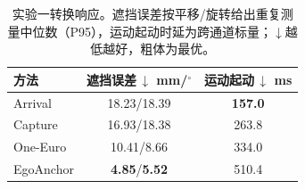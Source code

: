 \begin{table}[t]
\centering
\caption{实验一转换响应。遮挡误差按平移/旋转给出重复测量中位数（P95），运动起动时延为跨通道标量；$\downarrow$越低越好，粗体为最优。}
\label{tab:exp1-transition}
\begin{tabular}{@{}lcc@{}}
\toprule
方法 & \shortstack{遮挡误差\,$\downarrow$\\mm/$^\circ$} & \shortstack{运动起动\,$\downarrow$\\ms} \\
\midrule
Arrival & 18.23/18.39 & \textbf{157.0} \\
Capture & 16.93/18.38 & 263.8 \\
One-Euro & 10.41/8.66 & 334.0 \\
EgoAnchor & \textbf{4.85}/\textbf{5.52} & 510.4 \\
\bottomrule
\end{tabular}
\end{table}
